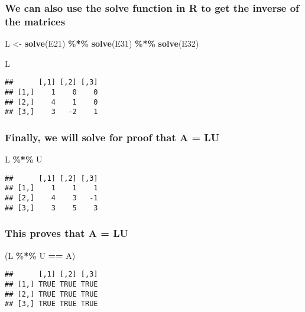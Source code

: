 \documentclass[
]{article}
\newenvironment{Shaded}{\begin{snugshade}}{\end{snugshade}}
\newcommand{\FunctionTok}[1]{\textcolor[rgb]{0.13,0.29,0.53}{\textbf{#1}}}
\newcommand{\NormalTok}[1]{#1}
\newcommand{\OtherTok}[1]{\textcolor[rgb]{0.56,0.35,0.01}{#1}}
\newcommand{\SpecialCharTok}[1]{\textcolor[rgb]{0.81,0.36,0.00}{\textbf{#1}}}
\begin{document}
\hypertarget{we-can-also-use-the-solve-function-in-r-to-get-the-inverse-of-the-matrices}{%
\subsubsection{We can also use the solve function in R to get the
inverse of the
matrices}\label{we-can-also-use-the-solve-function-in-r-to-get-the-inverse-of-the-matrices}}

\begin{Shaded}
\begin{Highlighting}[]
\NormalTok{L }\OtherTok{\textless{}{-}} \FunctionTok{solve}\NormalTok{(E21) }\SpecialCharTok{\%*\%} \FunctionTok{solve}\NormalTok{(E31) }\SpecialCharTok{\%*\%} \FunctionTok{solve}\NormalTok{(E32)}

\NormalTok{L}
\end{Highlighting}
\end{Shaded}

\begin{verbatim}
##      [,1] [,2] [,3]
## [1,]    1    0    0
## [2,]    4    1    0
## [3,]    3   -2    1
\end{verbatim}

\hypertarget{finally-we-will-solve-for-proof-that-a-lu}{%
\subsubsection{Finally, we will solve for proof that A =
LU}\label{finally-we-will-solve-for-proof-that-a-lu}}

\begin{Shaded}
\begin{Highlighting}[]
\NormalTok{L }\SpecialCharTok{\%*\%}\NormalTok{ U}
\end{Highlighting}
\end{Shaded}

\begin{verbatim}
##      [,1] [,2] [,3]
## [1,]    1    1    1
## [2,]    4    3   -1
## [3,]    3    5    3
\end{verbatim}

\hypertarget{this-proves-that-a-lu}{%
\subsubsection{This proves that A = LU}\label{this-proves-that-a-lu}}

\begin{Shaded}
\begin{Highlighting}[]
\NormalTok{(L }\SpecialCharTok{\%*\%}\NormalTok{ U }\SpecialCharTok{==}\NormalTok{ A)}
\end{Highlighting}
\end{Shaded}

\begin{verbatim}
##      [,1] [,2] [,3]
## [1,] TRUE TRUE TRUE
## [2,] TRUE TRUE TRUE
## [3,] TRUE TRUE TRUE
\end{verbatim}
\end{document}
